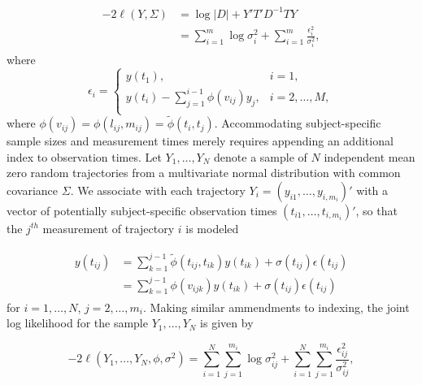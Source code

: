 \documentclass[12pt]{article}
\theoremstyle{definition}
\begin{document}
\begin{align}
\begin{split} \label{eq:loglik-cholesky-form}
-2\ell\left( Y, \Sigma \right) &= \log \vert D \vert + Y' T' D^{-1} T Y \\
&= \sum_{i = 1}^m \log \sigma_i^2  + \sum_{i = 1}^m \frac {\epsilon_i^2}{\sigma_i^2},
\end{split}
\end{align}
\noindent
where 
\begin{equation} \label{eq:loglik-cholesky-form}
\epsilon_i = \left\{\begin{array}{lr}y\left(t_1\right), & i = 1, \\
y\left(t_i\right) - \sum_{j = 1}^{i-1} \phi\left(v_{ij}\right) y_j, & i= 2, \dots, M, \\
\end{array} \right.
\end{equation}
\noindent
where $\phi\left(v_{ij}\right) = \phi\left(l_{ij},m_{ij}\right) = \tilde{\phi}\left(t_i,t_j\right)$.  Accommodating subject-specific sample sizes and measurement times merely requires appending an additional index to observation times. Let  $Y_1, \dots, Y_N$ denote a sample of $N$ independent mean zero random trajectories from a  multivariate normal distribution with common covariance $\Sigma$. We associate with each trajectory $Y_i = \left(y_{i1}, \dots, y_{i,m_i}\right)'$ with a vector of potentially subject-specific observation times $\left(t_{i1}, \dots, t_{i,m_i}\right)'$, so that the $j^{th}$ measurement of trajectory $i$ is modeled

\begin{align}
\begin{split} \label{eq:cholesky-regression-model-2} 
y\left(t_{ij} \right)  &= \sum_{k=1}^{j-1} \tilde{\phi}\left(t_{ij} ,t_{ik}\right) y\left(t_{ik}\right) + \sigma\left(t_{ij}\right)\epsilon\left(t_{ij}\right)  \\
&= \sum_{k=1}^{j-1} \phi\left(v_{ijk}\right) y\left(t_{ik}\right) + \sigma\left(t_{ij}\right)\epsilon\left(t_{ij}\right)
\end{split}
\end{align}
\noindent
for $i = 1,\dots, N$, $j = 2,\dots, m_i$.
\noindent
Making similar ammendments to indexing, the joint log likelihood for the sample $Y_1, \dots, Y_N$ is given by  

\begin{equation} \label{eq:joint-loglik}
-2\ell\left( Y_1,\dots, Y_N, \phi, \sigma^2 \right) = \sum_{i = 1}^N \sum_{j = 1}^{m_i} \log \sigma_{ij}^2  + \sum_{i = 1}^N \sum_{j = 1}^{m_i} \frac {\epsilon_{ij}^2}{\sigma_{ij}^2},
\end{equation}
\end{document}
